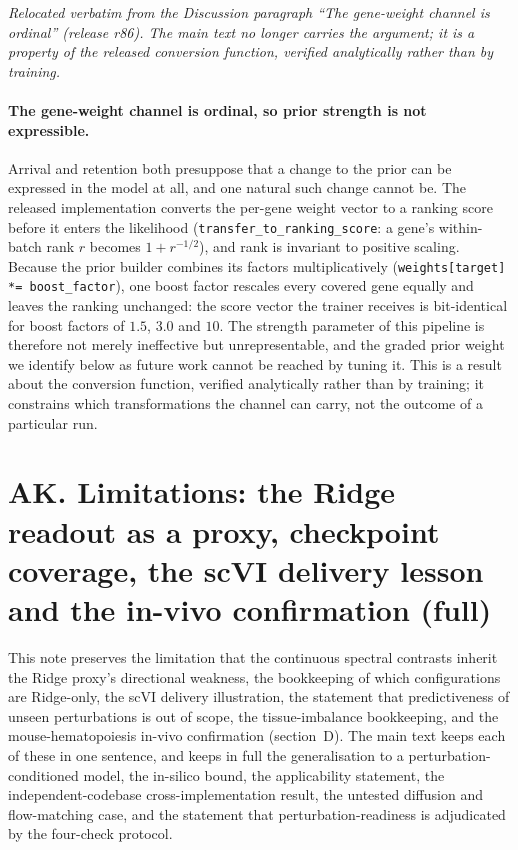 \documentclass[11 pt,a4 paper]{article}
\begin{document}
\noindent\emph{Relocated verbatim from the Discussion paragraph ``The gene-weight channel is ordinal'' (release r86). The main text no longer carries the argument; it is a property of the released conversion function, verified analytically rather than by training.}

\paragraph*{The gene-weight channel is ordinal, so prior strength is not expressible.}
Arrival and retention both presuppose that a change to the prior can be expressed in
the model at all, and one natural such change cannot be. The released implementation
converts the per-gene weight vector to a ranking score before it enters the likelihood
(\texttt{transfer\_to\_ranking\_score}: a gene's within-batch rank $r$ becomes
$1+r^{-1/2}$), and rank is invariant to positive scaling. Because the prior builder
combines its factors multiplicatively (\texttt{weights[target] *= boost\_factor}), one
boost factor rescales every covered gene equally and leaves the ranking unchanged: the
score vector the trainer receives is bit-identical for boost factors of $1.5$, $3.0$
and $10$. The strength parameter of this pipeline is therefore not merely ineffective
but unrepresentable, and the graded prior weight we identify below as future work
cannot be reached by tuning it. This is a result about the conversion function,
verified analytically rather than by training; it constrains which transformations the
channel can carry, not the outcome of a particular run.

\clearpage

\section*{AK. Limitations: the Ridge readout as a proxy, checkpoint coverage, the scVI delivery lesson and the in-vivo confirmation (full)}

This note preserves the limitation that the continuous spectral contrasts inherit the Ridge
proxy's directional weakness, the bookkeeping of which configurations are Ridge-only, the scVI
delivery illustration, the statement that predictiveness of unseen perturbations is out of scope,
the tissue-imbalance bookkeeping, and the mouse-hematopoiesis in-vivo confirmation (section~D). The
main text keeps each of these in one sentence, and keeps in full the generalisation to a
perturbation-conditioned model, the in-silico bound, the applicability statement, the
independent-codebase cross-implementation result, the untested diffusion and flow-matching case,
and the statement that perturbation-readiness is adjudicated by the four-check protocol.
\end{document}
